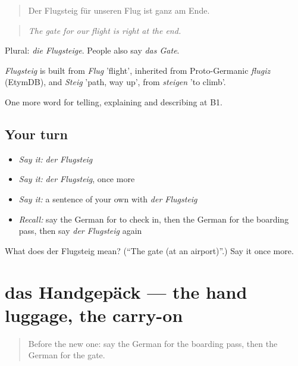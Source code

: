 \begin{quote}
Der Flugsteig für unseren Flug ist ganz am Ende.
\end{quote}

\begin{quote}
\emph{The gate for our flight is right at the end.}
\end{quote}

Plural: \emph{die Flugsteige}. People also say \emph{das Gate}.

\begin{cousinweb}
\emph{Flugsteig} is built from \emph{Flug} 'flight', inherited from Proto-Germanic \emph{flugiz} (EtymDB), and \emph{Steig} 'path, way up', from \emph{steigen} 'to climb'.
\end{cousinweb}

\begin{grammarlens}[title={What you've built}]
One more word for telling, explaining and describing at B1.
\end{grammarlens}

\subsection*{Your turn}
\begin{itemize}
\raggedright
  \item \emph{Say it:} \emph{der Flugsteig}
  \item \emph{Say it:} \emph{der Flugsteig}, once more
  \item \emph{Say it:} a sentence of your own with \emph{der Flugsteig}
  \item \emph{Recall:} say the German for to check in, then the German for the boarding pass, then say \emph{der Flugsteig} again
\end{itemize}

\begin{tcolorbox}[breakable,colback=teal!4,colframe=teal!35!black,title={Before you move on}]
What does der Flugsteig mean? (\textquotedblleft{}The gate (at an airport)\textquotedblright{}.) Say it once more.
\end{tcolorbox}
\section[das Handgepäck]{das Handgepäck — the hand luggage, the carry-on}

\label{lesson:GE-C416-handgepaeck}



\begin{quote}
Before the new one: say the German for the boarding pass, then the German for the gate.
\end{quote}

